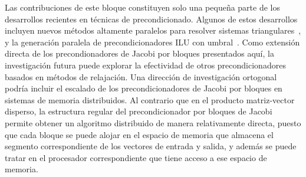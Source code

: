 Las contribuciones de este bloque constituyen solo una pequeña parte de los
desarrollos recientes en técnicas de precondicionado. Algunos de estos
desarrollos incluyen nuevos métodos altamente paralelos para resolver sistemas
triangulares~\cite{triangular-solve, isai, triangular-iterative}, y la
generación paralela de precondicionadores ILU con umbral~\cite{ilut, ilut-gpu}.
Como extensión directa de los precondionadores de Jacobi por bloques presentados
aquí, la investigación futura puede explorar la efectividad de otros
precondicionadores basados en métodos de relajación. Una dirección de
investigación ortogonal podría incluir el escalado de los precondicionadores de
Jacobi por bloques en sistemas de memoria distribuidos. Al contrario que en el
producto matriz-vector disperso, la estructura regular del precondicionador por
bloques de Jacobi permite obtener un algoritmo distribuido de manera
relativamente directa, puesto que cada bloque se puede alojar en el espacio de
memoria que almacena el segmento correspondiente de los vectores de entrada y
salida, y además se puede tratar en el procesador correspondiente que tiene
acceso a ese espacio de memoria.

